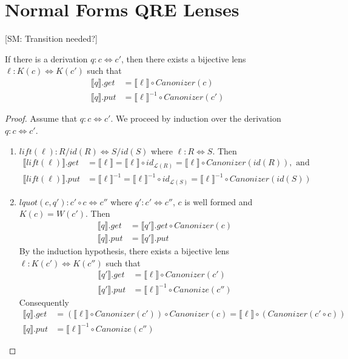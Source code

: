 \documentclass{svproc}
\newcommand{\FINISH}[3]{\ifdraft\textcolor{#1}{[#2: #3]}\fi}
\newcommand{\sam}[1]{\FINISH{dkpurple}{SM}{#1}}
\newcommand{\canonizer}{\ensuremath{\mathit{Canonizer}}}
\begin{document}
\section{Normal Forms QRE Lenses}
\sam{Transition needed?}
\begin{theorem}\label{normal form}
If there is a derivation $q : c \Leftrightarrow c'$, then there exists a
bijective lens $\ell : K(c) \Leftrightarrow K(c')$ such that
\begin{align*}
\llbracket q \rrbracket.get &= \llbracket \ell \rrbracket\circ \canonizer(c)\\
\llbracket q \rrbracket.put &= \llbracket \ell \rrbracket^{-1} \circ
\canonizer(c')
\end{align*}
\end{theorem}
\begin{proof}
Assume that $q : c \Leftrightarrow c'$. We proceed by induction over the
derivation $q : c \Leftrightarrow c'$.
\begin{enumerate}
  \item
  $\mathit{lift}(\ell): R/\mathit{id}(R) \Leftrightarrow S/\mathit{id}(S)$ where
  $\ell :
  R \Leftrightarrow S$. Then
  \begin{align*}
  \llbracket \mathit{lift}(\ell) \rrbracket.get &=  \llbracket \ell \rrbracket
  = \llbracket \ell \rrbracket \circ id_{\mathcal{L}(R)} =
  \llbracket \ell \rrbracket \circ \canonizer(\mathit{id}(R)), \text{ and }\\
  \llbracket \mathit{lift}(\ell) \rrbracket.put &= \llbracket \ell
  \rrbracket^{-1} = \llbracket \ell \rrbracket^{-1} \circ id_{\mathcal{L}(S)} =
  \llbracket \ell \rrbracket^{-1} \circ \canonizer(id(S))
  \end{align*}
  \item
  $\mathit{lquot}(c, q'): c' \circ c \Leftrightarrow c''$ where $q' : c' 
  \Leftrightarrow c''$, $c$ is well formed and $K(c) = W(c')$. Then
\begin{align*}
  \llbracket q \rrbracket.get  &= \llbracket q'
  \rrbracket.get \circ \canonizer(c)\\
  \llbracket q \rrbracket.put &= \llbracket q' \rrbracket.put
  \end{align*}
  By the induction hypothesis, there exists a bijective lens $\ell :
  K(c') \Leftrightarrow K(c'')$ such that 
  \begin{align*}
\llbracket q' \rrbracket.get &= \llbracket \ell \rrbracket \circ \canonizer(c')\\
\llbracket q' \rrbracket.put &= \llbracket \ell \rrbracket^{-1} \circ
Canonize(c'')
\end{align*}
Consequently
\begin{align*}
  \llbracket q \rrbracket.get  &= (\llbracket \ell \rrbracket \circ
  \canonizer(c')) \circ \canonizer(c) = \llbracket \ell \rrbracket \circ
  (\canonizer(c' \circ c))\\
  \llbracket q \rrbracket.put &= \llbracket \ell \rrbracket^{-1} \circ
  Canonize(c'')
  \end{align*}


\end{enumerate}
\end{proof}
\end{document}
